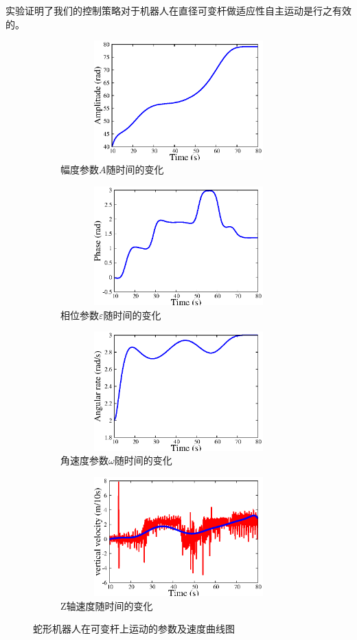 实验证明了我们的控制策略对于机器人在直径可变杆做适应性自主运动是行之有效的。
\begin{figure}[htbp]
	\centering
	\begin{subfigure}{0.45\textwidth}{
			\centering
			\includegraphics[width=1\textwidth,height=130pt]{figure/chap05/BSB/a.eps}
			\caption{幅度参数$A$随时间的变化}
			\label{fig:bsa}
		}
	\end{subfigure}
	\begin{subfigure}{0.45\textwidth}{
			\centering
			\includegraphics[width=1\textwidth,height=130pt]{figure/chap05/BSB/p.eps}
			\caption{相位参数$\varepsilon$随时间的变化}
			\label{fig:bsp}
		}
	\end{subfigure}
	\begin{subfigure}{0.45\textwidth}{
			\centering
			\includegraphics[width=1\textwidth,height=130pt]{figure/chap05/BSB/w.eps}
			\caption{角速度参数$\omega$随时间的变化}
			\label{fig:bsw}
		}
	\end{subfigure}
	\begin{subfigure}{0.45\textwidth}{
			\centering
			\includegraphics[width=1\textwidth,height=130pt]{figure/chap05/BSB/v}
			\caption{Z轴速度随时间的变化}
			\label{fig:bsv}
		}
	\end{subfigure}
	\caption{蛇形机器人在可变杆上运动的参数及速度曲线图}
	\label{fig:BSB2}
\end{figure}


